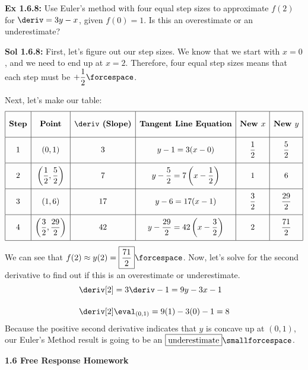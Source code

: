 \begin{tcolorbox}[example]
    \textbf{Ex 1.6.8: } Use Euler's method with four equal step sizes to approximate $f(2)$ for $\deriv = 3y - x$, given $f(0) = 1$. Is this an overestimate or an underestimate?
\end{tcolorbox} 
\begin{tcolorbox}[solution]
    \textbf{Sol 1.6.8: } First, let's figure out our step sizes. We know that we start with $x = 0$, and we need to end up at $x = 2$. Therefore, four equal step sizes means that each step must be $+\dfrac{1}{2} \forcespace$. \par
    Next, let's make our table: \begin{align*}
        \def\arraystretch{2.2} 
        \begin{array}{|c|c|c|c|c|c|}
            \hline
            \textbf{Step} & \textbf{Point} & \deriv \textbf{ (Slope)} & \textbf{Tangent Line Equation} & \textbf{New } x & \textbf{New } y \\[5.5pt] \hline
            1 & (0, 1) & 3 & y - 1 = 3(x - 0) & \dfrac{1}{2} & \dfrac{5}{2} \\[5.5pt] \hline
            2 & \left(\dfrac{1}{2}, \dfrac{5}{2}\right) & 7 & y - \dfrac{5}{2} = 7\left(x - \dfrac{1}{2}\right) & 1 & 6 \\[5.5pt] \hline
            3 & (1, 6) & 17 & y - 6 = 17(x - 1) & \dfrac{3}{2} & \dfrac{29}{2} \\[5.5pt] \hline
            4 & \left(\dfrac{3}{2}, \dfrac{29}{2}\right) & 42 & y - \dfrac{29}{2} = 42\left(x - \dfrac{3}{2}\right) & 2 & \dfrac{71}{2} \\[5.5pt]
            \hline
        \end{array}
    \end{align*}
    We can see that $f(2) \approx y(2) = \boxed{\dfrac{71}{2}} \forcespace$. Now, let's solve for the second derivative to find out if this is an overestimate or underestimate. \begin{align*}
        & \deriv[2] = 3\deriv - 1 = 9y - 3x - 1 \\[11pt]
        & \deriv[2] \eval_{(0, 1)} = 9(1) - 3(0) - 1 = 8
    \end{align*}
    Because the positive second derivative indicates that $y$ is concave up at $(0, 1)$, our Euler's Method result is going to be an $\boxed{\text{underestimate}} \smallforcespace$.
\end{tcolorbox}

\newpage

\textbf{\large{1.6 Free Response Homework}} \par


